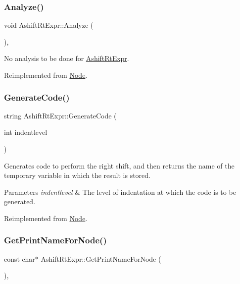 \subsubsection{\texorpdfstring{Analyze()}{Analyze()}}
{\footnotesize\ttfamily void Ashift\+Rt\+Expr\+::\+Analyze (\begin{DoxyParamCaption}{ }\end{DoxyParamCaption})\hspace{0.3cm}{\ttfamily [inline]}, {\ttfamily [virtual]}}

No analysis to be done for \hyperlink{class_ashift_rt_expr}{Ashift\+Rt\+Expr}. 

Reimplemented from \hyperlink{class_node_a5f88d55c6f253a29def7ccc443d83d47}{Node}.

\mbox{\label{class_ashift_rt_expr_aec58e35be6c2f84aeb345e48777e2370}} 
\subsubsection{\texorpdfstring{Generate\+Code()}{GenerateCode()}}
{\footnotesize\ttfamily string Ashift\+Rt\+Expr\+::\+Generate\+Code (\begin{DoxyParamCaption}\item[{int}]{indentlevel }\end{DoxyParamCaption})\hspace{0.3cm}{\ttfamily [virtual]}}

Generates code to perform the right shift, and then returns the name of the temporary variable in which the result is stored. 
\begin{DoxyParams}{Parameters}
{\em indentlevel} & The level of indentation at which the code is to be generated. \\
\hline
\end{DoxyParams}


Reimplemented from \hyperlink{class_node_acb60e526730e8436056375a3055c2c32}{Node}.

\mbox{\label{class_ashift_rt_expr_a59b494552a66bdb8a407acb30d6ddc5b}} 
\subsubsection{\texorpdfstring{Get\+Print\+Name\+For\+Node()}{GetPrintNameForNode()}}
{\footnotesize\ttfamily const char$\ast$ Ashift\+Rt\+Expr\+::\+Get\+Print\+Name\+For\+Node (\begin{DoxyParamCaption}{ }\end{DoxyParamCaption})\hspace{0.3cm}{\ttfamily [inline]}, {\ttfamily [virtual]}}

